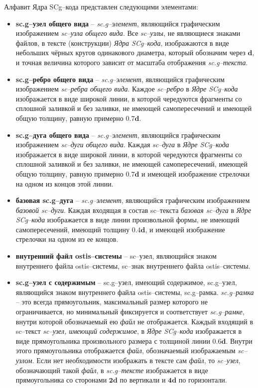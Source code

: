 Алфавит Ядра SCg--кода представлен следующими элементами:
\begin{itemize}
	\item \textbf{sc.g--узел общего вида} -- \textit{sc.g--элемент}, являющийся графическим изображением \textit{sc--узла общего вида}. Все \textit{sc--узлы}, не являющиеся знаками файлов, в тексте (конструкции) \textit{Ядра SCg--кода}, изображаются в виде небольших чёрных кругов одинакового диаметра, который обозначим через $\bm{d}$, и точная величина которого зависит от масштаба отображения \textit{sc.g--текста}.
	
	\item \textbf{sc.g--ребро общего вида} -- \textit{sc.g--элемент}, являющийся графическим изображением \textit{sc--ребра общего вида}. Каждое \textit{sc--ребро} в \textit{Ядре SCg--кода} изображается в виде широкой линии, в которой чередуются фрагменты со сплошной заливкой и без заливки, не имеющей самопересечений и имеющей общую толщину, равную примерно $\bm{0.7d}$.
	
	\item \textbf{sc.g--дуга общего вида} -- \textit{sc.g--элемент}, являющийся графическим изображением \textit{sc--дуги общего вида}. Каждая \textit{sc--дуга} в \textit{Ядре SCg--кода} изображается в виде широкой линии, в которой чередуются фрагменты со сплошной заливкой и без заливки, не имеющей самопересечений, имеющей общую толщину, равную примерно $\bm{0.7d}$ и имеющей изображение стрелочки на одном из концов этой линии.
	
	\item \textbf{базовая sc.g--дуга} -- \textit{sc.g--элемент}, являющийся графическим изображением \textit{базовой sc--дуги}. Каждая входящая в состав sc--текста \textit{базовая sc--дуга} в \textit{Ядре SCg--кода} изображается в виде линии произвольной формы, не имеющий самопересечений, имеющий толщину $\bm{0.4d}$, и имеющей изображение стрелочки на одном из ее концов.
	
	\item \textbf{внутренний файл ostis--системы} -- sc--узел, являющийся знаком внутреннего файла ostis--системы, sc--знак внутреннего файла ostis--системы.
	
	\item \textbf{sc.g--узел с содержимым} -- sc.g--узел, имеющий содержимое, sc.g--узел, являющийся знаком внутреннего файла ostis--системы, sc.g--рамка. \textit{sc.g--рамка} -- это всегда прямоугольник, максимальный размер которого не ограничивается, но минимальный фиксируется и соответствует \textit{sc.g--рамке}, внутри которой обозначаемый ею \textit{файл} не отображается. Каждый входящий в sc--текст \textit{sc--узел, имеющий содержимое}, в \textit{Ядре SCg--кода} изображается в виде прямоугольника произвольного размера с толщиной линии $\bm{0.6d}$. Внутри этого прямоугольника отображается \textit{файл}, обозначаемый изображаемым \textit{sc--узлом}. Если нет необходимости изображать в тексте сам \textit{файл}, то \textit{sc--узел}, обозначающий такой \textit{файл}, в \textit{sc.g--тексте} изображается в виде прямоугольника со сторонами $\bm{2d}$ по вертикали и $\bm{4d}$ по горизонтали.
\end{itemize}


